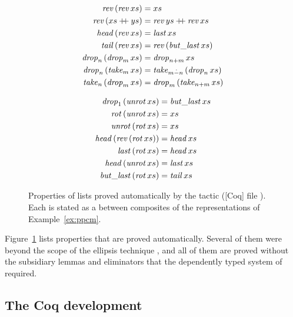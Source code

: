 \documentclass{fundam}
\begin{document}
\begin{figure}[t]
  \centering
  \begin{minipage}{0.48\textwidth}
    \begin{align*}
      \mathit{rev}\,(\mathit{rev}\,xs) &= xs \\
      \mathit{rev}\,(xs \mathbin{+\!\!+} ys) &= \mathit{rev}\,ys \mathbin{+\!\!+} \mathit{rev}\,xs \\
      \mathit{head}\,(\mathit{rev}\,xs) &= \mathit{last}\,xs \\
      \mathit{tail}\,(\mathit{rev}\,xs) &= \mathit{rev}\,(\mathit{but\_last}\,xs) \\
      \mathit{drop}_n\,(\mathit{drop}_m\,xs) &= \mathit{drop}_{n+m}\,xs \\
      \mathit{drop}_n\,(\mathit{take}_m\,xs) &= \mathit{take}_{m \mathbin{\dot{-}} n}\,(\mathit{drop}_n\,xs) \\
      \mathit{take}_n\,(\mathit{drop}_m\,xs) &= \mathit{drop}_m\,(\mathit{take}_{n+m}\,xs)
    \end{align*}
  \end{minipage}
  \begin{minipage}{0.48\textwidth}
    \begin{align*}
      \mathit{drop}_1\,(\mathit{unrot}\,xs) &= \mathit{but\_last}\,xs \\
      \mathit{rot}\,(\mathit{unrot}\,xs) &= xs \\
      \mathit{unrot}\,(\mathit{rot}\,xs) &= xs \\
      \mathit{head}\,(\mathit{rev}\,(\mathit{rot}\,xs)) &= \mathit{head}\,xs \\
      \mathit{last}\,(\mathit{rot}\,xs) &= \mathit{head}\,xs \\
      \mathit{head}\,(\mathit{unrot}\,xs) &= \mathit{last}\,xs \\
      \mathit{but\_last}\,(\mathit{rot}\,xs) &= \mathit{tail}\,xs
    \end{align*}
  \end{minipage}
  \caption{Properties of lists proved automatically by the tactic 
    (\textsf{[Coq]} file ).  Each is stated as a  between
    composites of the representations of Example~\ref{ex:ppcm}.}\label{fig:properties}
\end{figure}

Figure~\ref{fig:properties} lists properties that are proved automatically.  Several
of them were beyond the scope of the ellipsis technique \cite{BundyRichardson99,Prince05},
and all of them are proved without the subsidiary lemmas and eliminators that the
dependently typed system of \cite{PrinceGhaniMcBride08} required.

\subsection{The Coq development}\label{sec:coq}
\end{document}
